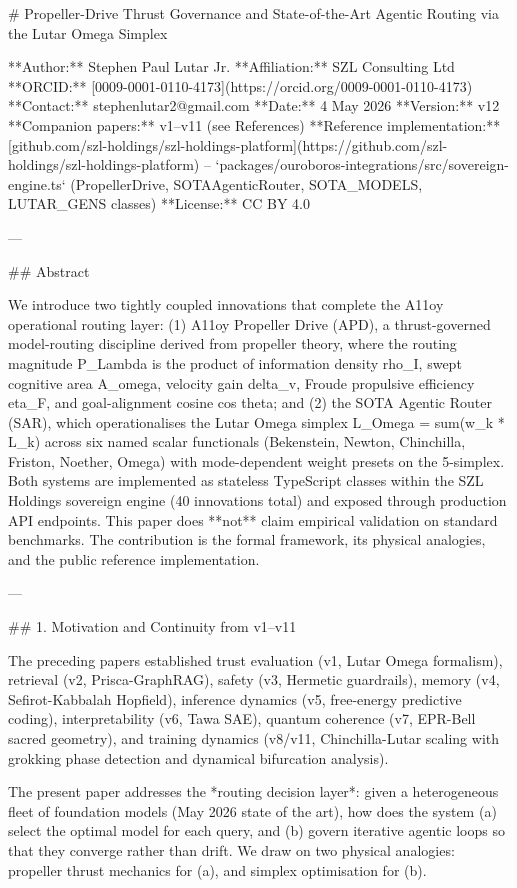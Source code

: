 # Propeller-Drive Thrust Governance and State-of-the-Art Agentic Routing via the Lutar Omega Simplex

**Author:** Stephen Paul Lutar Jr.
**Affiliation:** SZL Consulting Ltd
**ORCID:** [0009-0001-0110-4173](https://orcid.org/0009-0001-0110-4173)
**Contact:** stephenlutar2@gmail.com
**Date:** 4 May 2026
**Version:** v12
**Companion papers:** v1--v11 (see References)
**Reference implementation:** [github.com/szl-holdings/szl-holdings-platform](https://github.com/szl-holdings/szl-holdings-platform) -- `packages/ouroboros-integrations/src/sovereign-engine.ts` (PropellerDrive, SOTAAgenticRouter, SOTA_MODELS, LUTAR_GENS classes)
**License:** CC BY 4.0

---

## Abstract

We introduce two tightly coupled innovations that complete the A11oy operational routing layer: (1) A11oy Propeller Drive (APD), a thrust-governed model-routing discipline derived from propeller theory, where the routing magnitude P_Lambda is the product of information density rho_I, swept cognitive area A_omega, velocity gain delta_v, Froude propulsive efficiency eta_F, and goal-alignment cosine cos theta; and (2) the SOTA Agentic Router (SAR), which operationalises the Lutar Omega simplex L_Omega = sum(w_k * L_k) across six named scalar functionals (Bekenstein, Newton, Chinchilla, Friston, Noether, Omega) with mode-dependent weight presets on the 5-simplex. Both systems are implemented as stateless TypeScript classes within the SZL Holdings sovereign engine (40 innovations total) and exposed through production API endpoints. This paper does **not** claim empirical validation on standard benchmarks. The contribution is the formal framework, its physical analogies, and the public reference implementation.

---

## 1. Motivation and Continuity from v1--v11

The preceding papers established trust evaluation (v1, Lutar Omega formalism), retrieval (v2, Prisca-GraphRAG), safety (v3, Hermetic guardrails), memory (v4, Sefirot-Kabbalah Hopfield), inference dynamics (v5, free-energy predictive coding), interpretability (v6, Tawa SAE), quantum coherence (v7, EPR-Bell sacred geometry), and training dynamics (v8/v11, Chinchilla-Lutar scaling with grokking phase detection and dynamical bifurcation analysis).

The present paper addresses the *routing decision layer*: given a heterogeneous fleet of foundation models (May 2026 state of the art), how does the system (a) select the optimal model for each query, and (b) govern iterative agentic loops so that they converge rather than drift. We draw on two physical analogies: propeller thrust mechanics for (a), and simplex optimisation for (b).

